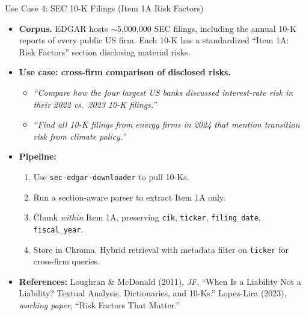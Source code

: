 \begin{frame}{Use Case 4: SEC 10-K Filings (Item 1A Risk Factors)}
\begin{itemize}
\item \textbf{Corpus.} EDGAR hosts $\sim$5{,}000{,}000 SEC filings, including the annual 10-K reports of every public US firm. Each 10-K has a standardized ``Item 1A: Risk Factors'' section disclosing material risks.

\medskip
\item \textbf{Use case: cross-firm comparison of disclosed risks.}
\begin{itemize}
    \item \emph{``Compare how the four largest US banks discussed interest-rate risk in their 2022 vs.\ 2023 10-K filings.''}
    \item \emph{``Find all 10-K filings from energy firms in 2024 that mention transition risk from climate policy.''}
\end{itemize}

\medskip
\item \textbf{Pipeline:}
\begin{enumerate}
    \item Use \texttt{sec-edgar-downloader} to pull 10-Ks.
    \item Run a section-aware parser to extract Item 1A only.
    \item Chunk \emph{within} Item 1A, preserving \texttt{cik}, \texttt{ticker}, \texttt{filing\_date}, \texttt{fiscal\_year}.
    \item Store in Chroma. Hybrid retrieval with metadata filter on \texttt{ticker} for cross-firm queries.
\end{enumerate}

\medskip
\item \textbf{References:} Loughran \& McDonald (2011), \emph{JF}, ``When Is a Liability Not a Liability? Textual Analysis, Dictionaries, and 10-Ks.''
Lopez-Lira (2023), \emph{working paper}, ``Risk Factors That Matter.''
\end{itemize}
\end{frame}

